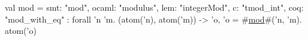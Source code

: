 val mod = {
  smt: "mod",
  ocaml: "modulus",
  lem: "integerMod",
  c: "tmod_int",
  coq: "mod_with_eq"
} : forall 'n 'm. (atom('n), atom('m)) -> {'o, 'o = #\hyperref[zmod]{mod}#('n, 'm). atom('o)}

